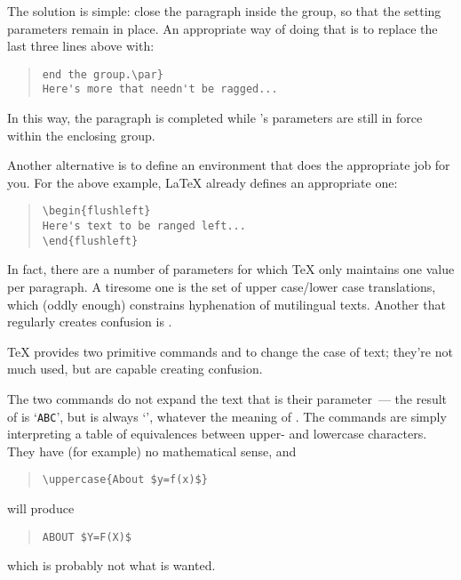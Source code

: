 The solution is simple: close the paragraph inside the group, so that
the setting parameters remain in place.  An appropriate way of doing
that is to replace the last three lines above with:
\begin{quote}
\begin{verbatim}
end the group.\par}
Here's more that needn't be ragged...
\end{verbatim}
\end{quote}
In this way, the paragraph is completed while 's
parameters are still in force within the enclosing group.

Another alternative is to define an environment that does the
appropriate job for you.  For the above example, \LaTeX{} already
defines an appropriate one:
\begin{quote}
\begin{verbatim}
\begin{flushleft}
Here's text to be ranged left...
\end{flushleft}
\end{verbatim}
\end{quote}

In fact, there are a number of parameters for which \TeX{} only
maintains one value per paragraph.  A tiresome one is the set of upper
case/lower case translations, which (oddly enough) constrains
hyphenation of mutilingual texts.  Another that regularly creates
confusion is .


\TeX{} provides two primitive commands  and
 to change the case of text; they're not much used, but
are capable creating confusion.

The two commands do not expand the text that is their parameter~---
the result of  is `\texttt{ABC}', but
 is always `', whatever the
meaning of .  The commands are simply interpreting a table of
equivalences between upper- and lowercase characters.
They have (for example) no mathematical sense, and
\begin{quote}
\begin{verbatim}
\uppercase{About $y=f(x)$}
\end{verbatim}
\end{quote}
will produce
\begin{quote}
\begin{verbatim}
ABOUT $Y=F(X)$
\end{verbatim}
\end{quote}
which is probably not what is wanted.

